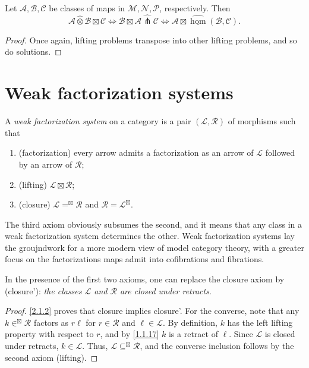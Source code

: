 \begin{lemma}\label{2.1.7}
	Let $\mathcal{A} ,\mathcal{B} ,\mathcal{C} $ be classes of maps in $\mathcal{M} ,\mathcal{N} ,\mathcal{P} $, respectively. Then
	\[
		\mathcal{A} \widehat{\otimes }\mathcal{B} \boxtimes \mathcal{C} \iff \mathcal{B} \boxtimes \mathcal{A} \widehat{\pitchfork}\mathcal{C} \iff \mathcal{A} \boxtimes \widehat{\underline{\operatorname{hom} } }(\mathcal{B} ,\mathcal{C} )
	.\]
\end{lemma}
\begin{proof}
	Once again, lifting problems transpose into other lifting problems, and so do solutions.
\end{proof}

\section{Weak factorization systems}

\begin{definition}\label{2.2.1}
	A \emph{weak factorization system} on a category is a pair $(\mathcal{L} ,\mathcal{R} )$ of morphisms such that
	\begin{enumerate}
		\item (factorization) every arrow admits a factorization as an arrow of $\mathcal{L} $ followed by an arrow of $\mathcal{R} $;
		\item (lifting) $\mathcal{L} \boxtimes \mathcal{R} $;
		\item (closure) $\mathcal{L} =^{\boxtimes} \mathcal{R} $ and $\mathcal{R} =\mathcal{L} ^{\boxtimes} $.
	\end{enumerate}
\end{definition}

\begin{remark}\label{2.2.2}
	The third axiom obviously subsumes the second, and it means that any class in a weak factorization system determines the other. Weak factorization systems lay the groujndwork for a more modern view of model category theory, with a greater focus on the factorizations maps admit into cofibrations and fibrations.
\end{remark}

\begin{lemma}\label{2.2.3}
	In the presence of the first two axioms, one can replace the closure axiom by (closure'): \emph{the classes $\mathcal{L} $ and $\mathcal{R} $ are closed under retracts}.
\end{lemma}
\begin{proof}
	\cref{2.1.2} proves that closure implies closure'. For the converse, note that any $k\in ^{\boxtimes} \mathcal{R} $ factors as $r\ell $ for $r\in \mathcal{R} $ and $\ell \in \mathcal{L} $. By definition, $k$ has the left lifting property with respect to $r$, and by \cref{1.1.17} $k$ is a retract of $\ell $. Since $\mathcal{L} $ is closed under retracts, $k\in \mathcal{L} $. Thus, $\mathcal{L} \subseteq ^{\boxtimes} \mathcal{R} $, and the converse inclusion follows by the second axiom (lifting).
\end{proof}

